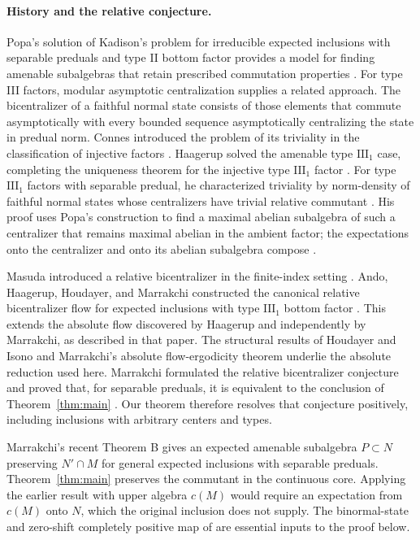\documentclass[11pt]{article}
\theoremstyle{definition}
\begin{document}
\paragraph{History and the relative conjecture.}
Popa's solution of Kadison's problem for irreducible expected inclusions
with separable preduals and type II bottom factor provides
a model for finding amenable subalgebras that retain prescribed
commutation properties \cite{Popa1981}. For type III factors, modular
asymptotic centralization supplies a related approach. The bicentralizer
of a faithful normal state consists of those elements that commute
asymptotically with every bounded sequence asymptotically centralizing
the state in predual norm. Connes introduced the problem of its triviality
in the classification of injective factors \cite{Connes1982,Connes1985}.
Haagerup solved the amenable type $\mathrm{III}_1$ case, completing the
uniqueness theorem for the injective type $\mathrm{III}_1$ factor
\cite{Haagerup}. For type $\mathrm{III}_1$ factors with separable predual,
he characterized
triviality by norm-density of faithful normal states whose centralizers
have trivial relative commutant \cite[Theorem~3.1]{Haagerup}.
His proof uses Popa's construction to find a maximal abelian subalgebra
of such a centralizer that remains maximal abelian in the ambient factor;
the expectations onto the centralizer and onto its abelian subalgebra
compose \cite[proof of Theorem~3.1]{Haagerup}.

Masuda introduced a relative bicentralizer in the finite-index setting
\cite[Definition~4.1]{Masuda2005}.
Ando, Haagerup, Houdayer, and Marrakchi constructed the canonical relative
bicentralizer flow for expected inclusions with type $\mathrm{III}_1$
bottom factor \cite[Theorem~A]{AHHM}. This extends the absolute flow
discovered by Haagerup and independently by Marrakchi, as described in
that paper. The structural results of Houdayer and Isono
\cite[Proposition~3.4 and Theorem~3.5]{HI2017} and Marrakchi's absolute
flow-ergodicity theorem \cite[Theorem~D]{M0} underlie the absolute
reduction used here.
Marrakchi formulated the relative bicentralizer conjecture and proved
that, for separable preduals, it is equivalent to the conclusion of
Theorem~\ref{thm:main} \cite[Conjecture~C and Theorem~D]{M1}.
Our theorem therefore resolves that conjecture positively, including
inclusions with arbitrary centers and types.

Marrakchi's recent Theorem B \cite{M2} gives an expected amenable
subalgebra $P\subset N$ preserving $N'\cap M$ for general expected
inclusions with separable preduals. Theorem~\ref{thm:main} preserves
the commutant in the continuous core. Applying the earlier result with
upper algebra $c(M)$ would require an expectation from $c(M)$ onto $N$,
which the original inclusion does not supply.
The binormal-state and zero-shift completely positive map of
\cite[Lemmas~2.1 and 2.2(1)]{M2} are essential inputs to the proof below.
\end{document}
